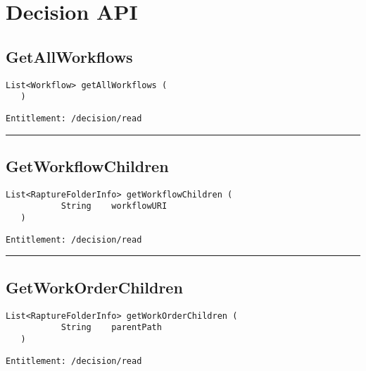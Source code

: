 \chapter{Decision API}

\section{GetAllWorkflows}
\label{Api:GetAllWorkflows}
\begin{lstlisting}[style=nonumbers]
   List<Workflow> getAllWorkflows (
   )
\end{lstlisting}
\begin{Verbatim}[formatcom=\color{Maroon}]
  Entitlement: /decision/read
\end{Verbatim}



\rule{12cm}{2pt}
\section{GetWorkflowChildren}
\label{Api:GetWorkflowChildren}
\begin{lstlisting}[style=nonumbers]
   List<RaptureFolderInfo> getWorkflowChildren (
           String    workflowURI
   )
\end{lstlisting}
\begin{Verbatim}[formatcom=\color{Maroon}]
  Entitlement: /decision/read
\end{Verbatim}



\rule{12cm}{2pt}
\section{GetWorkOrderChildren}
\label{Api:GetWorkOrderChildren}
\begin{lstlisting}[style=nonumbers]
   List<RaptureFolderInfo> getWorkOrderChildren (
           String    parentPath
   )
\end{lstlisting}
\begin{Verbatim}[formatcom=\color{Maroon}]
  Entitlement: /decision/read
\end{Verbatim}



